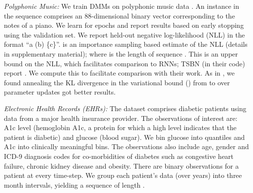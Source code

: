 \documentclass[letterpaper]{article}
\theoremstyle{plain}
\newcommand{\citep}{\cite}
\begin{document}
\textit{Polyphonic Music: }
We train DMMs on polyphonic music data \cite{boulanger2012modeling}. 
An instance in the sequence comprises 
an 88-dimensional binary vector corresponding to the notes of a piano. 
We learn for  epochs and report results based on early stopping using the validation set. 
We report held-out negative log-likelihood (NLL) in the format ``a (b) \{c\}''.
 is an importance sampling based estimate of the
NLL (details in supplementary material);
 where  is the length
of sequence . This is an upper bound on the NLL, which facilitates comparison
to RNNs;
TSBN \cite{gan2015deep} (in their code) report 
. We compute this 
to facilitate comparison with their work.
As in \citep{howtotrain}, we found 
annealing the KL divergence in the variational bound () from  to  over
 parameter updates got better results. 

\textit{Electronic Health Records (EHRs): } 
The dataset comprises  diabetic patients using data from a major health insurance provider. 
The observations of interest are: A1c level (hemoglobin A1c, a protein
for which a high level indicates that the patient is diabetic) and glucose (blood sugar).
We bin glucose into quantiles and A1c into clinically meaningful bins. The observations also include age, gender and ICD-9 
diagnosis codes for co-morbidities of diabetes such as congestive heart failure, chronic kidney disease and obesity. 
There are  binary observations for a patient at every time-step. 
We group each patient's data (over  years) into three month intervals, yielding a sequence of length . 
\end{document}

